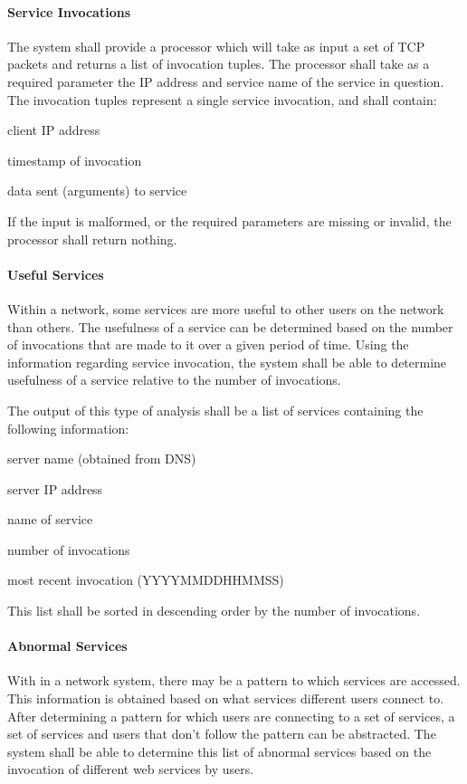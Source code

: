\documentclass[titlepage]{article}
\begin{document}
\paragraph{Service Invocations}

The system shall provide a processor which will take as input a set of TCP
packets and returns a list of invocation tuples.  The processor shall take as a
required parameter the IP address and service name of the service in question.
The invocation tuples represent a single service invocation, and shall contain:
\begin{itemize*}
    \item client IP address
    \item timestamp of invocation
    \item data sent (arguments) to service
\end{itemize*}
If the input is malformed, or the required parameters are missing or invalid,
the processor shall return nothing.

\paragraph{Useful Services} 
Within a network, some services are more useful to other users on the network
than others. The usefulness of a service can be determined based on the number
of invocations that are made to it over a given period of time.  Using the
information regarding service invocation, the system shall be able to determine
usefulness of a service relative to the number of invocations.

The output of this type of analysis shall be a list of services containing the
following information:
\begin{itemize*}
    \item server name (obtained from DNS)
    \item server IP address
    \item name of service
    \item number of invocations
    \item most recent invocation (YYYYMMDDHHMMSS)
\end{itemize*}
This list shall be sorted in descending order by the number of invocations.

\paragraph{Abnormal Services} 
With in a network system, there may be a pattern to which services are
accessed. This information is obtained based on what services different users
connect to. After determining a pattern for which users are connecting to a set
of services, a set of services and users that don't follow the pattern can be
abstracted. The system shall be able to determine this list of abnormal
services based on the invocation of different web services by users.
            
\end{document}
